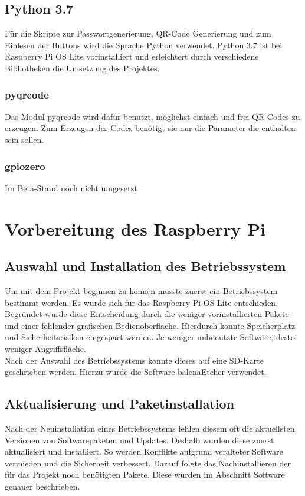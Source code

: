 \documentclass[a4paper,11pt,singlespacing]{article}
\begin{document}
    		\subsection{Python 3.7}
    			Für die Skripte zur Passwortgenerierung, QR-Code Generierung und zum Einlesen der Buttons wird die Sprache Python verwendet. Python 3.7 ist bei Raspberry Pi OS Lite  vorinstalliert und erleichtert durch verschiedene Bibliotheken die Umsetzung des Projektes.
    			\subsubsection{pyqrcode}
    				Das Modul pyqrcode wird dafür benutzt, möglichst einfach und frei QR-Codes zu erzeugen. Zum Erzeugen des Codes benötigt sie nur die Parameter die enthalten sein sollen.
    			\subsubsection{gpiozero}
    				Im Beta-Stand noch nicht umgesetzt
    	
    	\section{Vorbereitung des Raspberry Pi}
    	\subsection{Auswahl und Installation des Betriebssystem}
    	    Um mit dem Projekt beginnen zu können musste zuerst ein Betriebssystem bestimmt werden.
        	Es wurde sich für das Raspberry Pi OS Lite entschieden. Begründet wurde diese Entscheidung  durch die weniger vorinstallierten Pakete und einer fehlender grafischen Bedienoberfläche. Hierdurch konnte Speicherplatz und Sicherheitsrisiken eingespart werden. Je weniger unbenutzte Software, desto weniger Angriffsfläche. \\ 
    	
        	Nach der Auswahl des Betriebssystems konnte dieses auf eine SD-Karte geschrieben werden.
        	Hierzu wurde die Software balenaEtcher verwendet.   
    	
    	
    	\subsection{Aktualisierung und Paketinstallation}
        	Nach der Neuinstallation eines Betriebssystems fehlen diesem oft die aktuellsten Versionen von Softwarepaketen und Updates. Deshalb wurden diese zuerst aktualisiert und installiert. So werden Konflikte aufgrund veralteter Software vermieden und die Sicherheit verbessert.  
        	Darauf folgte das Nachinstallieren der für das Projekt noch benötigten Pakete. Diese wurden im Abschnitt Software genauer beschrieben. 
    	
\end{document}
